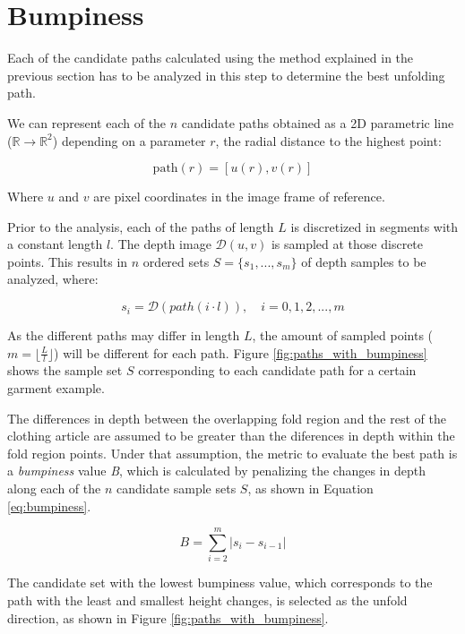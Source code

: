 \section{Bumpiness}
\label{pnp:bumpiness}
Each of the candidate paths calculated using the method explained in the previous section has to be analyzed in this step to determine the best unfolding path. 

We can represent each of the $n$ candidate paths obtained as a 2D parametric line ($\mathbb{R} \to \mathbb{R}^2$) depending on a parameter $r$, the radial distance to the highest point:

\begin{equation}
\textrm{path}(r) = \left[u(r), v(r)\right]
\end{equation}

Where $u$ and $v$ are pixel coordinates in the image frame of reference.

Prior to the analysis, each of the paths of length $L$ is discretized in segments with a constant length $l$. The depth image $\mathcal{D}(u,v)$ is sampled at those discrete points. This results in $n$ ordered sets $S=\{ s_1,...,s_m\}$ of depth samples to be analyzed, where:


\begin{equation}
s_i = \mathcal{D}(path(i \cdot l)), \quad  i=0,1,2,..., m
\end{equation}

As the different paths may differ in length $L$, the amount of sampled points ($m=${\Large$\lfloor\frac{L}{l}\rfloor$}) will be different for each path. Figure \ref{fig:paths_with_bumpiness} shows the sample set $S$ corresponding to each candidate path for a certain garment example.

The differences in depth between the overlapping fold region and the rest of the clothing article are assumed to be greater than the diferences in depth within the fold region points. Under that assumption, the metric to evaluate the best path is a \textit{bumpiness} value \textit{B}, which is calculated by penalizing the changes in depth along each of the $n$ candidate sample sets $S$, as shown in Equation \ref{eq:bumpiness}.

\begin{equation}\label{eq:bumpiness}
B = \sum_{i=2}^{m} | s_i- s_{i-1} | 
\end{equation}

The candidate set with the lowest bumpiness value, which corresponds to the path with the least and smallest height changes, is selected as the unfold direction, as shown in Figure \ref{fig:paths_with_bumpiness}.

